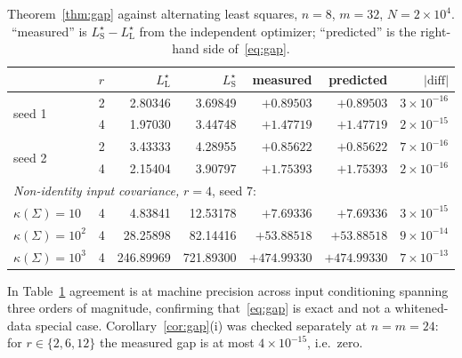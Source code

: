 \documentclass{article}
\theoremstyle{remark}
\begin{document}
\begin{table}[h]
\centering
\caption{Theorem~\ref{thm:gap} against alternating least squares,
$n=8$, $m=32$, $N=2\times10^4$. ``measured'' is
$L_{\mathrm{S}}^{\star}-L_{\mathrm{L}}^{\star}$ from the independent optimizer;
``predicted'' is the right-hand side of~\eqref{eq:gap}.}
\label{tab:gapcheck}
\begin{tabular}{llrrrrr}
\toprule
 & $r$ & $L_{\mathrm{L}}^{\star}$ & $L_{\mathrm{S}}^{\star}$ & measured & predicted & $|\text{diff}|$ \\
\midrule
\multirow{2}{*}{seed 1} & 2 & 2.80346 & 3.69849 & $+0.89503$ & $+0.89503$ & $3\!\times\!10^{-16}$ \\
                        & 4 & 1.97030 & 3.44748 & $+1.47719$ & $+1.47719$ & $2\!\times\!10^{-15}$ \\
\multirow{2}{*}{seed 2} & 2 & 3.43333 & 4.28955 & $+0.85622$ & $+0.85622$ & $7\!\times\!10^{-16}$ \\
                        & 4 & 2.15404 & 3.90797 & $+1.75393$ & $+1.75393$ & $2\!\times\!10^{-16}$ \\
\midrule
\multicolumn{7}{l}{\emph{Non-identity input covariance,} $r=4$, seed 7:}\\
$\kappa(\Sigma)=10$    & 4 &   4.83841 &  12.53178 & $+7.69336$   & $+7.69336$   & $3\!\times\!10^{-15}$ \\
$\kappa(\Sigma)=10^2$  & 4 &  28.25898 &  82.14416 & $+53.88518$  & $+53.88518$  & $9\!\times\!10^{-14}$ \\
$\kappa(\Sigma)=10^3$  & 4 & 246.89969 & 721.89300 & $+474.99330$ & $+474.99330$ & $7\!\times\!10^{-13}$ \\
\bottomrule
\end{tabular}
\end{table}

In Table~\ref{tab:gapcheck} agreement is at machine precision across input
conditioning spanning three orders of magnitude, confirming that~\eqref{eq:gap}
is exact and not a whitened-data special case. Corollary~\ref{cor:gap}(i) was checked separately
at $n=m=24$: for $r\in\{2,6,12\}$ the measured gap is at most
$4\times10^{-15}$, i.e.\ zero.
\end{document}

